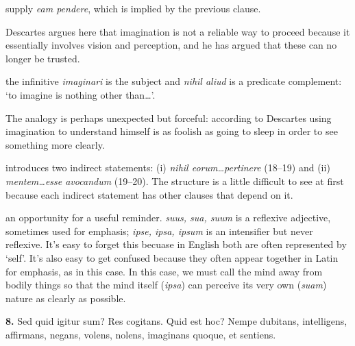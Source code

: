  supply \textit{eam pendere}, which is implied by the previous clause.

 Descartes argues here that imagination is not a reliable way to proceed because it essentially involves vision and perception, and he has argued that these can no longer be trusted.

 the infinitive \textit{imaginari} is the subject and \textit{nihil aliud} is a predicate complement: `to imagine is nothing other than\dots'.

 The analogy is perhaps unexpected but forceful: according to Descartes using imagination to understand himself is as foolish as going to sleep in order to see something more clearly.

 introduces two indirect statements: (i) \textit{nihil eorum\dots pertinere} (18--19) and (ii) \textit{mentem\dots esse avocandum} (19--20). The structure is a little difficult to see at first because each indirect statement has other clauses that depend on it.

 an opportunity for a useful reminder. \textit{suus, sua, suum} is a reflexive adjective, sometimes used for emphasis; \textit{ipse, ipsa, ipsum} is an intensifier but never reflexive. It's easy to forget this becuase in English both are often represented by `self'. It's also easy to get confused because they often appear together in Latin for emphasis, as in this case. In this case, we must call the mind away from bodily things so that the mind itself (\textit{ipsa}) can perceive its very own (\textit{suam}) nature as clearly as possible.

\clearpage

\beginnumbering
\pstart
\begin{latin}
    \textenglish{\textbf{8.}} Sed quid igitur sum? Res cogitans. Quid est hoc? Nempe dubitans, intelligens, affirmans, negans, volens, nolens, imaginans quoque, et sentiens.
\end{latin}
\pend
\endnumbering


